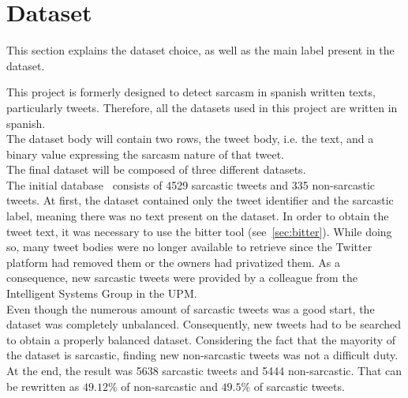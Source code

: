\section{Dataset}
\label{sec:use-cases}
This section explains the dataset choice, as well as the main label present in the dataset.\par
This project is formerly designed to detect sarcasm in spanish written texts, particularly tweets. Therefore, all the datasets used in this project are written in spanish.\\
The dataset body will contain two rows, the tweet body, i.e. the text, and a binary value expressing the sarcasm nature of that tweet.\\
The final dataset will be composed of three different datasets.\\ 
The initial database~\cite{mexic} consists of 4529 sarcastic tweets and 335 non-sarcastic tweets. At first, the dataset contained only the tweet identifier and the sarcastic label, meaning there was no text present on the dataset. In order to obtain the tweet text, it was necessary to use the bitter tool (see~\cref{sec:bitter}). While doing so, many tweet bodies were no longer available to retrieve since the Twitter platform had removed them or the owners had privatized them. As a consequence, new sarcastic tweets were provided by a colleague from the Intelligent Systems Group in the UPM.\\
Even though the numerous amount of sarcastic tweets was a good start, the dataset was completely unbalanced. Consequently, new tweets had to be searched to obtain a properly balanced dataset. Considering the fact that the mayority of the dataset is sarcastic, finding new non-sarcastic tweets was not a difficult duty.\\
At the end, the result was 5638 sarcastic tweets and 5444 non-sarcastic. That can be rewritten as $49.12\%$ of non-sarcastic and $49.5\%$ of sarcastic tweets.\par


